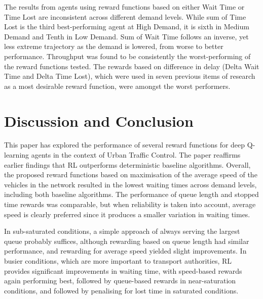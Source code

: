 \documentclass{article}
\begin{document}
The results from agents using reward functions based on either Wait Time or Time Lost are inconsistent across different demand levels.
While sum of Time Lost is the third best-performing agent at High Demand, it is sixth in Medium Demand and Tenth in Low Demand.
Sum of Wait Time follows an inverse, yet less extreme trajectory as the demand is lowered, from worse to better performance.
Throughput was found to be consistently the worst-performing of the reward functions tested.
The rewards based on difference in delay (Delta Wait Time and Delta Time Lost), which were used in seven previous items of research as a most desirable reward function, were amongst the worst performers.


\section{Discussion and Conclusion}
This paper has explored the performance of several reward functions for deep Q-learning agents in the context of Urban Traffic Control. The paper reaffirms earlier findings that RL outperforms deterministic baseline algorithms.
Overall, the proposed reward functions based on maximisation of the average speed of the vehicles in the network resulted in the lowest waiting times across demand levels, including both baseline algorithms.
The performance of queue length and stopped time rewards was comparable, but when reliability is taken into account, average speed is clearly preferred since it produces a smaller variation in waiting times.

In sub-saturated conditions, a simple approach of always serving the largest queue probably suffices, although rewarding based on queue length had similar performance, and rewarding for average speed yielded slight improvements.
In busier conditions, which are more important to transport authorities, RL provides significant improvements in waiting time, with speed-based rewards again performing best, followed by queue-based rewards in near-saturation conditions, and followed by penalising for lost time in saturated conditions.
\end{document}
